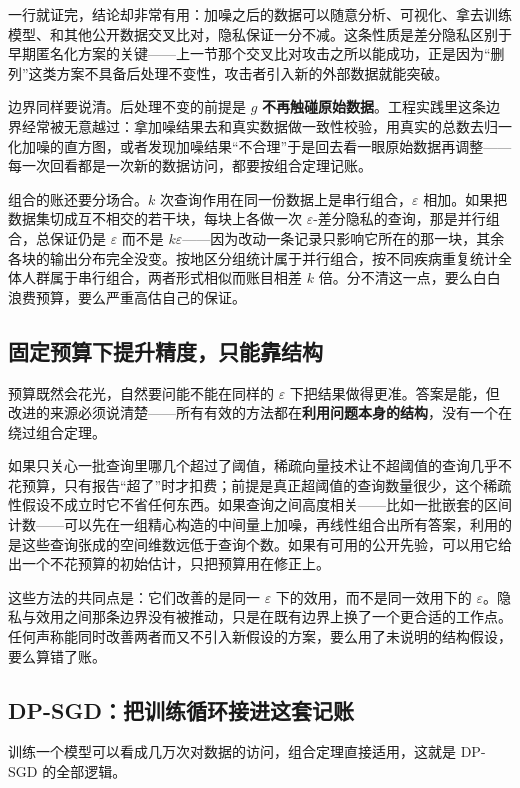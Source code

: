 一行就证完，结论却非常有用：加噪之后的数据可以随意分析、可视化、拿去训练模型、和其他公开数据交叉比对，隐私保证一分不减。这条性质是差分隐私区别于早期匿名化方案的关键——上一节那个交叉比对攻击之所以能成功，正是因为``删列''这类方案不具备后处理不变性，攻击者引入新的外部数据就能突破。

边界同样要说清。后处理不变的前提是 \(g\) \textbf{不再触碰原始数据}。工程实践里这条边界经常被无意越过：拿加噪结果去和真实数据做一致性校验，用真实的总数去归一化加噪的直方图，或者发现加噪结果``不合理''于是回去看一眼原始数据再调整——每一次回看都是一次新的数据访问，都要按组合定理记账。

组合的账还要分场合。\(k\) 次查询作用在同一份数据上是串行组合，\(\varepsilon\) 相加。如果把数据集切成互不相交的若干块，每块上各做一次 \(\varepsilon\)-差分隐私的查询，那是并行组合，总保证仍是 \(\varepsilon\) 而不是 \(k\varepsilon\)——因为改动一条记录只影响它所在的那一块，其余各块的输出分布完全没变。按地区分组统计属于并行组合，按不同疾病重复统计全体人群属于串行组合，两者形式相似而账目相差 \(k\) 倍。分不清这一点，要么白白浪费预算，要么严重高估自己的保证。

\subsection{固定预算下提升精度，只能靠结构}

预算既然会花光，自然要问能不能在同样的 \(\varepsilon\) 下把结果做得更准。答案是能，但改进的来源必须说清楚——所有有效的方法都在\textbf{利用问题本身的结构}，没有一个在绕过组合定理。

如果只关心一批查询里哪几个超过了阈值，稀疏向量技术让不超阈值的查询几乎不花预算，只有报告``超了''时才扣费；前提是真正超阈值的查询数量很少，这个稀疏性假设不成立时它不省任何东西。如果查询之间高度相关——比如一批嵌套的区间计数——可以先在一组精心构造的中间量上加噪，再线性组合出所有答案，利用的是这些查询张成的空间维数远低于查询个数。如果有可用的公开先验，可以用它给出一个不花预算的初始估计，只把预算用在修正上。

这些方法的共同点是：它们改善的是同一 \(\varepsilon\) 下的效用，而不是同一效用下的 \(\varepsilon\)。隐私与效用之间那条边界没有被推动，只是在既有边界上换了一个更合适的工作点。任何声称能同时改善两者而又不引入新假设的方案，要么用了未说明的结构假设，要么算错了账。

\subsection{DP-SGD：把训练循环接进这套记账}

训练一个模型可以看成几万次对数据的访问，组合定理直接适用，这就是 DP-SGD 的全部逻辑。

